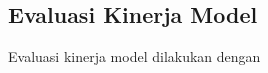 \subsection{Evaluasi Kinerja Model}
\label{subsec:evaluasi-kinerja-model}

Evaluasi kinerja model dilakukan dengan 